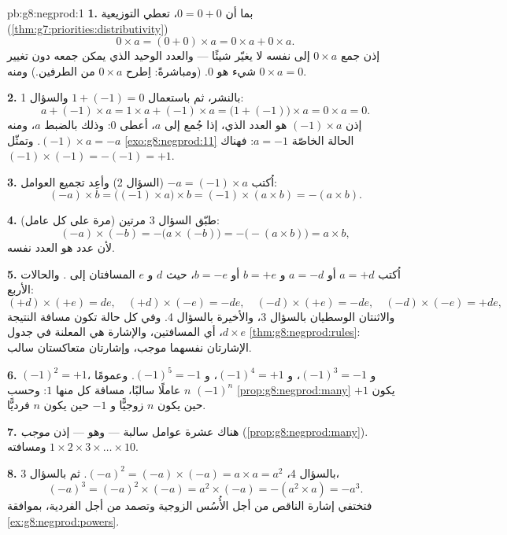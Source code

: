 \begin{solution}{pb:g8:negprod:1}
\textbf{1.} بما أن $0 = 0 + 0$، تعطي التوزيعية
(\cref{thm:g7:priorities:distributivity})
\[
0 \times a = (0 + 0) \times a = 0 \times a + 0 \times a .
\]
إذن جمع $0 \times a$ إلى نفسه لا يغيّر شيئًا --- والعدد الوحيد
الذي يمكن جمعه دون تغيير شيء هو $0$. (ومباشرةً:
اِطرح $0 \times a$ من الطرفين.) ومنه $0 \times a = 0$.

\textbf{2.} بالنشر، ثم باستعمال $1 + (-1) = 0$ والسؤال 1:
\[
a + (-1) \times a
= 1 \times a + (-1) \times a
= \bigl(1 + (-1)\bigr) \times a
= 0 \times a = 0 .
\]
إذن $(-1) \times a$ هو العدد الذي، إذا جُمع إلى $a$، أعطى $0$:
وذلك بالضبط  $a$، ومنه $(-1) \times a = -a$.
وتمثّل \cref{exo:g8:negprod:11} الحالة الخاصّة $a = -1$: فهناك
$(-1) \times (-1) = -(-1) = +1$.

\textbf{3.} اُكتب $-a = (-1) \times a$ (السؤال 2) وأعِد تجميع
العوامل:
\[
(-a) \times b
= \bigl((-1) \times a\bigr) \times b
= (-1) \times (a \times b)
= -(a \times b) .
\]

\textbf{4.} طبّق السؤال 3 مرتين (مرة على كل عامل):
\[
(-a) \times (-b)
= -\bigl(a \times (-b)\bigr)
= -\bigl(-(a \times b)\bigr)
= a \times b ,
\]
لأن   عدد هو العدد نفسه.

\textbf{5.} اُكتب $a = +d$ أو $a = -d$ و $b = +e$ أو $b = -e$،
حيث $d$ و $e$ المسافتان إلى . والحالات الأربع:
\[
(+d) \times (+e) = de, \quad
(+d) \times (-e) = -de, \quad
(-d) \times (+e) = -de, \quad
(-d) \times (-e) = +de,
\]
والاثنتان الوسطيان بالسؤال 3، والأخيرة بالسؤال 4. وفي كل حالة
تكون مسافة النتيجة $d \times e$، أي 
المسافتين، والإشارة هي المعلنة في جدول
\cref{thm:g8:negprod:rules}: الإشارتان نفسهما موجب، وإشارتان متعاكستان
سالب.

\textbf{6.} $(-1)^2 = +1$، و $(-1)^3 = -1$، و $(-1)^4 = +1$،
و $(-1)^5 = -1$. وعمومًا $(-1)^n$  $n$ عاملًا سالبًا،
مسافة كل منها $1$: وحسب \cref{prop:g8:negprod:many} يكون
$+1$ حين يكون $n$ زوجيًّا و $-1$ حين يكون $n$ فرديًّا.

\textbf{7.} هناك عشرة عوامل سالبة --- وهو  --- إذن
 \emph{موجب} (\cref{prop:g8:negprod:many}). ومسافته
$1 \times 2 \times 3 \times \dots \times 10$.

\textbf{8.} بالسؤال 4، $(-a)^2 = (-a) \times (-a) = a \times a =
a^2$. ثم بالسؤال 3،
\[
(-a)^3 = (-a)^2 \times (-a) = a^2 \times (-a) = -(a^2 \times a)
= -a^3 .
\]
فتختفي إشارة الناقص من أجل الأُسُس الزوجية وتصمد من أجل
الفردية، بموافقة \cref{ex:g8:negprod:powers}.


\end{solution}
